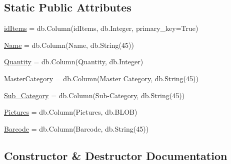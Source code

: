 \subsection*{Static Public Attributes}
\begin{DoxyCompactItemize}
\item 
\hyperlink{class_web_content_1_1classes_1_1items_ae81c7aff4b6699e4b73fdc2c58e7c17f}{id\+Items} = db.\+Column(\textquotesingle{}id\+Items\textquotesingle{}, db.\+Integer, primary\+\_\+key=True)
\item 
\hyperlink{class_web_content_1_1classes_1_1items_a6a1379cac2a7bf703ceb71edecf3acc5}{Name} = db.\+Column(\textquotesingle{}Name\textquotesingle{}, db.\+String(45))
\item 
\hyperlink{class_web_content_1_1classes_1_1items_a7105b3f7ed1d73cf52a44da05cfff28f}{Quantity} = db.\+Column(\textquotesingle{}Quantity\textquotesingle{}, db.\+Integer)
\item 
\hyperlink{class_web_content_1_1classes_1_1items_ab8196afab5769ae5b04ecf49b2d4d7f5}{Master\+Category} = db.\+Column(\textquotesingle{}Master Category\textquotesingle{}, db.\+String(45))
\item 
\hyperlink{class_web_content_1_1classes_1_1items_a44695dda5b4093b841ea73cbec40dd4f}{Sub\+\_\+\+Category} = db.\+Column(\textquotesingle{}Sub-\/Category\textquotesingle{}, db.\+String(45))
\item 
\hyperlink{class_web_content_1_1classes_1_1items_a74c7139df2b88c915288895e82362451}{Pictures} = db.\+Column(\textquotesingle{}Pictures\textquotesingle{}, db.\+B\+L\+OB)
\item 
\hyperlink{class_web_content_1_1classes_1_1items_a869446b40bb9b616dc8467ba8fdf8f08}{Barcode} = db.\+Column(\textquotesingle{}Barcode\textquotesingle{}, db.\+String(45))
\end{DoxyCompactItemize}


\subsection{Constructor \& Destructor Documentation}
\mbox{\label{class_web_content_1_1classes_1_1items_afba53e358f6f442934b6ff98bb0172c2}} 
